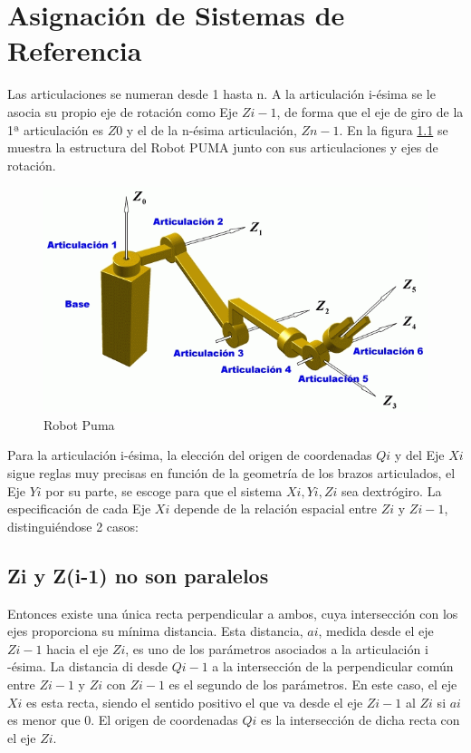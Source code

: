 \documentclass[11pt,a4paper,oldfontcommands,oneside]{memoir}
\begin{document}
\chapter{Asignación de Sistemas de Referencia}
Las articulaciones se numeran desde 1 hasta n. A la articulación i-ésima se le asocia su propio eje de rotación como Eje $Zi-1$, de forma que el eje de giro de la 1ª articulación es $Z0$ y el de la n-ésima articulación, $Zn-1$.
En la figura \ref{1} se muestra la estructura del Robot PUMA junto con sus articulaciones y ejes de rotación.

\begin{figure}[h]
	\includegraphics[scale=1]{1.png}
	\caption{Robot Puma}
	\label{1}
\end{figure}

Para la articulación i-ésima, la elección del origen de coordenadas $Qi$ y del Eje $Xi$ sigue reglas muy precisas en función de la geometría de los brazos articulados, el Eje $Yi$ por su parte, se escoge para que el sistema ${Xi, Yi, Zi}$ sea dextrógiro. La especificación de cada Eje $Xi$ depende de la relación espacial entre $Zi$ y $Zi-1$, distinguiéndose 2 casos:

\section{Zi y Z(i-1) no son paralelos}
Entonces existe una única recta perpendicular a ambos, cuya intersección con los ejes proporciona su mínima distancia. Esta distancia, $ai$, medida desde el eje $Zi-1$ hacia el eje $Zi$, es uno de los parámetros asociados a la articulación i -ésima.
La distancia di desde $Qi-1$ a la intersección de la perpendicular común entre $Zi-1$ y $Zi$ con $Zi-1$ es el segundo de los parámetros. En este caso, el eje $Xi$ es esta recta, siendo el sentido positivo el que va desde el eje $Zi-1$ al $Zi$ si $ai$ es menor que 0.
El origen de coordenadas $Qi$ es la intersección de dicha recta con el eje $Zi$.
\end{document}
